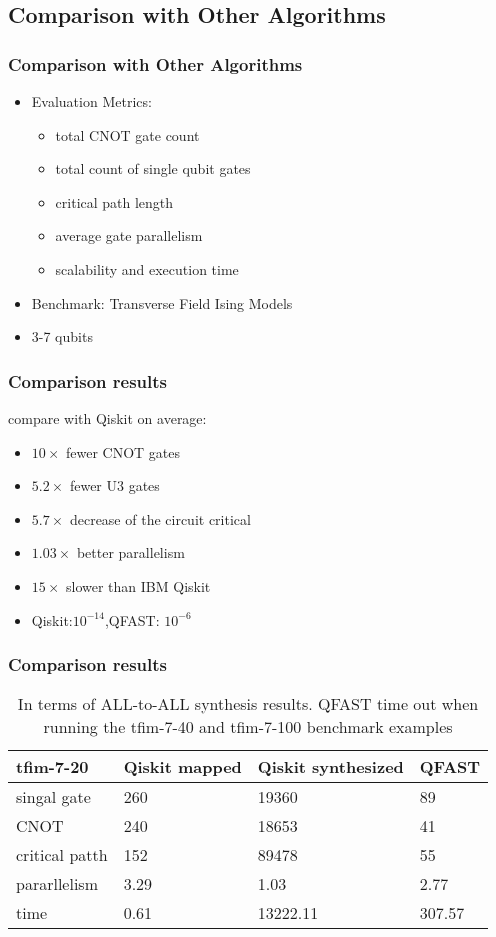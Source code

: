 \subsection{Comparison with Other Algorithms}
\begin{frame}
\frametitle{Comparison with Other Algorithms}
\begin{itemize}
  \item Evaluation Metrics:
  \begin{itemize}
    \item total CNOT gate count
    \item total count of single qubit gates
    \item critical path length
    \item average gate parallelism
    \item scalability and execution time
  \end{itemize}
  \item Benchmark: Transverse Field Ising Models
  \item 3-7 qubits
\end{itemize}
\end{frame}

\begin{frame}
\frametitle{Comparison results}
compare with Qiskit on average:
\begin{itemize}
  \item $10\times$ fewer CNOT gates
  \item $5.2\times$ fewer U3 gates
  \item $5.7\times$ decrease of the circuit critical
  \item $1.03\times$ better parallelism
  \item $15\times$ slower than IBM Qiskit
  \item Qiskit:$10^{-14}$,QFAST: $10^{-6}$
\end{itemize}
\end{frame}

\begin{frame}
  \frametitle{Comparison results}

  \begin{table}[]
    \begin{tabular}{l|lll}
    tfim-7-20  & Qiskit mapped & Qiskit synthesized & QFAST  \\\hline
    singal gate    & 260           & 19360              & 89     \\
    CNOT           & 240           & 18653              & 41     \\
    critical patth & 152           & 89478              & 55     \\
    pararllelism   & 3.29          & 1.03               & 2.77   \\
    time           & 0.61          & 13222.11           & 307.57
    \end{tabular}
    \caption{In terms of ALL-to-ALL synthesis results. QFAST time out when running the tfim-7-40 and tfim-7-100 benchmark examples}
    \end{table}
\end{frame}

